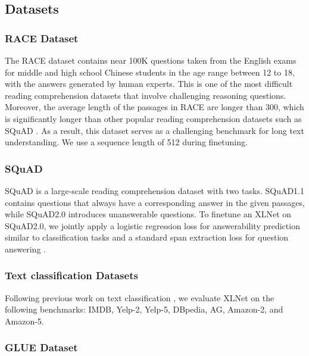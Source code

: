 \documentclass{article}
\begin{document}
\subsection{Datasets} \label{sec:datasets}

\subsubsection{RACE Dataset}

The RACE dataset \cite{lai2017large} contains near 100K questions taken from the English exams for middle and high school Chinese students in the age range between 12 to 18, with the answers generated by human experts. This is one of the most difficult reading comprehension datasets that involve challenging reasoning questions. Moreover, the average length of the passages in RACE are longer than 300, which is significantly longer than other popular reading comprehension datasets such as SQuAD \cite{rajpurkar2018know}. As a result, this dataset serves as a challenging benchmark for long text understanding. We use a sequence length of 512 during finetuning.

\subsubsection{SQuAD}

SQuAD is a large-scale reading comprehension dataset with two tasks. SQuAD1.1 \cite{rajpurkar2016squad} contains questions that always have a corresponding answer in the given passages, while SQuAD2.0 \cite{rajpurkar2018know} introduces unanswerable questions. To finetune an XLNet on SQuAD2.0, we jointly apply a logistic regression loss for answerability prediction similar to classification tasks and a standard span extraction loss for question answering \cite{devlin2018bert}.


\subsubsection{Text classification Datasets}

Following previous work on text classification \cite{zhang2015character,miyato2016adversarial}, we evaluate XLNet on the following benchmarks: IMDB, Yelp-2, Yelp-5, DBpedia, AG, Amazon-2, and Amazon-5.

\subsubsection{GLUE Dataset}
\end{document}
